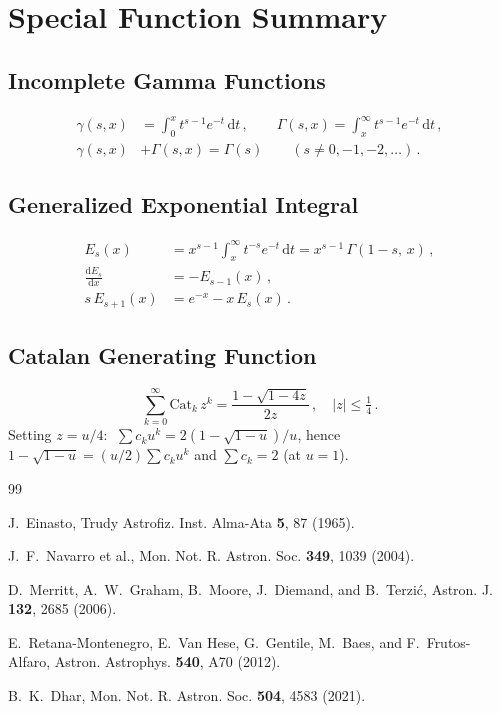 \documentclass{article}
\begin{document}
\section{Special Function Summary}
\label{app:special-fns}

\subsection{Incomplete Gamma Functions}
\begin{align}
\gamma(s,x) &= \int_0^x t^{s-1}e^{-t}\,\mathrm{d}t\,,\qquad
\Gamma(s,x) = \int_x^\infty t^{s-1}e^{-t}\,\mathrm{d}t\,,\\
\gamma(s,x) &+ \Gamma(s,x) = \Gamma(s) \qquad (s\neq0,-1,-2,\ldots)\,.
\end{align}

\subsection{Generalized Exponential Integral}
\begin{align}
E_s(x) &= x^{s-1}\int_x^\infty t^{-s}e^{-t}\,\mathrm{d}t
= x^{s-1}\,\Gamma(1-s,\,x)\,,\\
\frac{\mathrm{d}E_s}{\mathrm{d}x} &= -E_{s-1}(x)\,,\\
s\,E_{s+1}(x) &= e^{-x} - x\,E_s(x)\,.
\end{align}

\subsection{Catalan Generating Function}
\begin{equation}
\sum_{k=0}^{\infty}\mathrm{Cat}_k\,z^k = \frac{1-\sqrt{1-4z}}{2z}\,,
\quad |z|\le\tfrac14\,.
\end{equation}
Setting $z=u/4$: $\;\sum c_k u^k = 2(1-\sqrt{1-u})/u$, hence
$1-\sqrt{1-u}=(u/2)\sum c_k u^k$ and $\sum c_k=2$ (at $u=1$).

\begin{thebibliography}{99}

J.~Einasto, Trudy Astrofiz. Inst. Alma-Ata \textbf{5}, 87 (1965).

J.~F.~Navarro et al., Mon. Not. R. Astron. Soc. \textbf{349}, 1039 (2004).

D.~Merritt, A.~W.~Graham, B.~Moore, J.~Diemand, and B.~Terzi\'c,
Astron. J. \textbf{132}, 2685 (2006).

E.~Retana-Montenegro, E.~Van Hese, G.~Gentile, M.~Baes, and
F.~Frutos-Alfaro, Astron. Astrophys. \textbf{540}, A70 (2012).

B.~K.~Dhar, Mon. Not. R. Astron. Soc. \textbf{504}, 4583 (2021).

\end{thebibliography}
\end{document}
